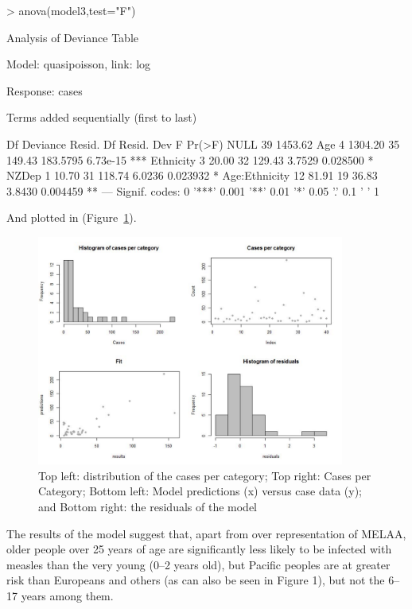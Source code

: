 \documentclass{article}
\begin{document}
\begin{Schunk}
\begin{Sinput}
> anova(model3,test="F")
\end{Sinput}
\begin{Soutput}
Analysis of Deviance Table

Model: quasipoisson, link: log

Response: cases

Terms added sequentially (first to last)


              Df Deviance Resid. Df Resid. Dev        F   Pr(>F)    
NULL                             39    1453.62                      
Age            4  1304.20        35     149.43 183.5795 6.73e-15 ***
Ethnicity      3    20.00        32     129.43   3.7529 0.028500 *  
NZDep          1    10.70        31     118.74   6.0236 0.023932 *  
Age:Ethnicity 12    81.91        19      36.83   3.8430 0.004459 ** 
---
Signif. codes:  0 '***' 0.001 '**' 0.01 '*' 0.05 '.' 0.1 ' ' 1
\end{Soutput}
\end{Schunk}

And plotted in (Figure~\ref{fig:regn}).
\begin{figure}
     \centering
     \includegraphics[width=0.9\textwidth]{Rplot_quasipoisson_noMLA.pdf}
     \caption{Top left: distribution of the cases per category; Top right: Cases per Category; Bottom left: Model predictions (x) versus case data (y); and Bottom right: the residuals of the model}
     \label{fig:regn}
\end{figure}

The results of the model suggest that, apart from over representation of MELAA, older people over 25 years of age are significantly less likely to be infected with measles than the very young (0--2 years old), but Pacific peoples are at greater risk than Europeans and others (as can also be seen in Figure 1), but not the 6--17 years among them.
\end{document}
